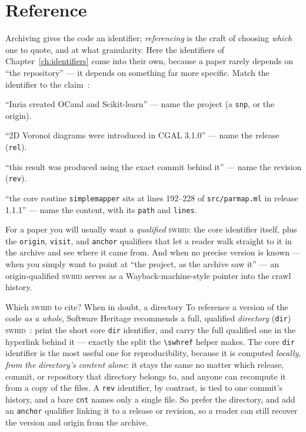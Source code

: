\section{Reference}

Archiving gives the code an identifier; \emph{referencing} is the craft of choosing \emph{which} one to
quote, and at what granularity. Here the identifiers of Chapter~\ref{ch:identifiers} come into
their own, because a paper rarely depends on ``the repository'' --- it depends on something far
more specific. Match the identifier to the claim~\autocite{cise-2020-doi}:

\begin{description}[leftmargin=!,labelwidth=2.6cm,font=\bfseries\sffamily]
  \item[the project] ``Inria created OCaml and Scikit-learn'' --- name the project (a \texttt{snp},
        or the origin).
  \item[a release] ``2D Voronoi diagrams were introduced in CGAL 3.1.0'' --- name the release
        (\texttt{rel}).
  \item[an exact state] ``this result was produced using the exact commit behind it'' --- name the
        revision (\texttt{rev}).
  \item[a code fragment] ``the core routine \texttt{simplemapper} sits at lines 192--228 of
        \texttt{src/parmap.ml} in release 1.1.1'' --- name the content, with its \texttt{path} and
        \texttt{lines}.
\end{description}

For a paper you will usually want a \emph{qualified} \textsc{swhid}: the core identifier itself,
plus the \texttt{origin}, \texttt{visit}, and \texttt{anchor} qualifiers that let a reader walk
straight to it in the archive and see where it came from. And when no precise version is known ---
when you simply want to point at ``the project, as the archive saw it'' --- an origin-qualified
\textsc{swhid} serves as a Wayback-machine-style pointer into the crawl history.

\begin{callout}{Which \textsc{swhid} to cite? When in doubt, a directory}
\small To reference a version of the code \emph{as a whole}, Software Heritage recommends a full,
qualified \emph{directory} (\texttt{dir}) \textsc{swhid}~\autocite{swhfaq_swhidtype}: print the short
core \texttt{dir} identifier, and carry the full qualified one in the hyperlink behind it --- exactly
the split the \texttt{\textbackslash swhref} helper makes. The core \texttt{dir} identifier is the most
useful one for reproducibility, because it is computed \emph{locally, from the directory's content
alone}: it stays the same no matter which release, commit, or repository that directory belongs to, and
anyone can recompute it from a copy of the files. A \texttt{rev} identifier, by contrast, is tied to
one commit's history, and a bare \texttt{cnt} names only a single file. So prefer the directory, and
add an \texttt{anchor} qualifier linking it to a release or revision, so a reader can still recover the
version and origin from the archive.
\end{callout}


